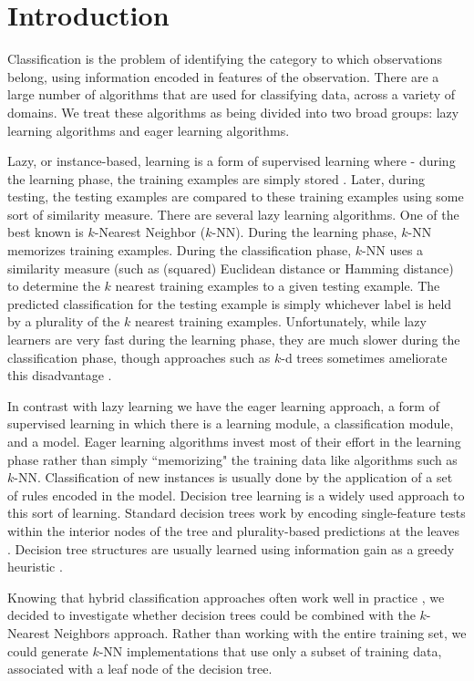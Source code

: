\section{Introduction}
Classification is the problem of identifying the category to which observations belong, using information encoded in features of the observation. There are a large number of algorithms that are used for classifying data, across a variety of domains.  We treat these algorithms as being divided into two broad groups: lazy learning algorithms and eager learning algorithms.

Lazy, or instance-based, learning is a form of supervised learning where - during the learning phase, the training examples are simply stored \cite{FathiMazinani}.  Later, during testing, the testing examples are compared to these training examples using some sort of similarity measure.  There are several lazy learning algorithms. One of the best known is $k$-Nearest Neighbor ($k$-NN). During the learning phase, $k$-NN memorizes training examples. During the classification phase, $k$-NN uses a similarity measure (such as (squared) Euclidean distance or Hamming distance) to determine the $k$ nearest training examples to a given testing example.  The predicted classification for the testing example is simply whichever label is held by a plurality of the $k$ nearest training examples.  Unfortunately, while lazy learners are very fast during the learning phase, they are much slower during the classification phase, though approaches such as $k$-d trees sometimes ameliorate this disadvantage \cite{Wettschereck}\cite{Sun}.

In contrast with lazy learning we have the eager learning approach, a form of supervised learning in which there is a learning module, a classification module, and a model. Eager learning algorithms invest most of their effort in the learning phase rather than simply ``memorizing" the training data like algorithms such as $k$-NN. Classification of new instances is usually done by the application of a set of rules encoded in the model. Decision tree learning is a widely used approach to this sort of learning. Standard decision trees work by encoding single-feature tests within the interior nodes of the tree and plurality-based predictions at the leaves \cite{FathiMazinani}.  Decision tree structures are usually learned using information gain as a greedy heuristic \cite{Kotsiantis}.

Knowing that hybrid classification approaches often work well in practice \cite{Friedl}, we decided to investigate whether decision trees could be combined with the $k$-Nearest Neighbors approach.  Rather than working with the entire training set, we could generate $k$-NN implementations that use only a subset of training data, associated with a leaf node of the decision tree.

